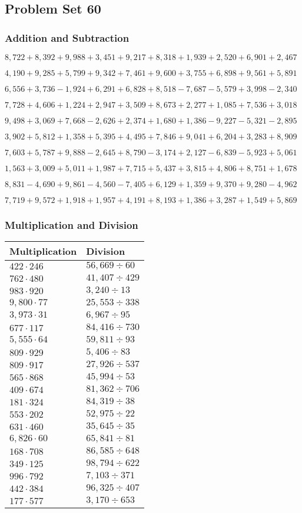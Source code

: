 \hypertarget{problem-set-60-2}{%
\subsection{Problem Set 60}\label{problem-set-60-2}}

\hypertarget{addition-and-subtraction-222}{%
\subsubsection{Addition and
Subtraction}\label{addition-and-subtraction-222}}

\(8,722+8,392+9,988+3,451+9,217+8,318+1,939+2,520+6,901+ 2,467\)

\(4,190+9,285+5,799+9,342+7,461+9,600+3,755+6,898+9,561+5,891\)

\(6,556+3,736-1,924+6,291+6,828+8,518-7,687-5,579+3,998-2,340\)

\(7,728+4,606+1,224+2,947+3,509+8,673+2,277+1,085+7,536+3,018\)

\(9,498+3,069+7,668-2,626+2,374+1,680+1,386-9,227-5,321-2,895\)

\(3,902+5,812+1,358+5,395+4,495+7,846+9,041+6,204+3,283+8,909\)

\(7,603+5,787+9,888-2,645+8,790-3,174+2,127-6,839-5,923+5,061\)

\(1,563+3,009+5,011+1,987+7,715+5,437+3,815+4,806+8,751+1,678\)

\(8,831-4,690+9,861-4,560-7,405+6,129+1,359+9,370+9,280-4,962\)

\(7,719+9,572+1,918+1,957+4,191+8,193+1,386+3,287+1,549+5,869\)

\hypertarget{multiplication-and-division-221}{%
\subsubsection{Multiplication and
Division}\label{multiplication-and-division-221}}

\begin{longtable}[]{@{}ll@{}}
\toprule
Multiplication & Division\tabularnewline
\midrule
\endhead
\(422\cdot246\) & \(56,669÷60\)\tabularnewline
\(762\cdot480\) & \(41,407÷429\)\tabularnewline
\(983\cdot920\) & \(3,240÷13\)\tabularnewline
\(9,800\cdot77\) & \(25,553÷338\)\tabularnewline
\(3,973\cdot31\) & \(6,967÷95\)\tabularnewline
\(677\cdot117\) & \(84,416÷730\)\tabularnewline
\(5,555\cdot64\) & \(59,811÷93\)\tabularnewline
\(809\cdot929\) & \(5,406÷83\)\tabularnewline
\(809\cdot917\) & \(27,926÷537\)\tabularnewline
\(565\cdot868\) & \(45,994÷53\)\tabularnewline
\(409\cdot674\) & \(81,362÷706\)\tabularnewline
\(181\cdot324\) & \(84,319÷38\)\tabularnewline
\(553\cdot202\) & \(52,975÷22\)\tabularnewline
\(631\cdot460\) & \(35,645÷35\)\tabularnewline
\(6,826\cdot60\) & \(65,841÷81\)\tabularnewline
\(168\cdot708\) & \(86,585÷648\)\tabularnewline
\(349\cdot125\) & \(98,794÷622\)\tabularnewline
\(996\cdot792\) & \(7,103÷371\)\tabularnewline
\(442\cdot384\) & \(96,325÷407\)\tabularnewline
\(177\cdot577\) & \(3,170÷653\)\tabularnewline
\bottomrule
\end{longtable}

